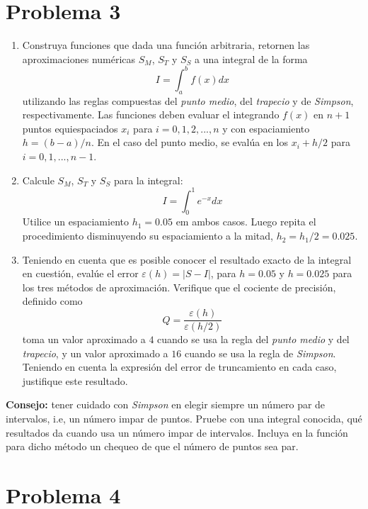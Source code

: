 \documentclass[11pt]{article}
\begin{document}
    \hypertarget{problema-3}{%
\section*{Problema 3}\label{problema-3}}

\begin{enumerate}
\def\labelenumi{\arabic{enumi}.}
\item
  Construya funciones que dada una función arbitraria, retornen las
  aproximaciones numéricas \(S_M\), \(S_T\) y \(S_S\) a una integral de
  la forma \[
  I = \int_a ^b f(x) dx
  \] utilizando las reglas compuestas del \emph{punto medio}, del
  \emph{trapecio} y de \emph{Simpson}, respectivamente. Las funciones
  deben evaluar el integrando \(f(x)\) en \(n+1\) puntos equiespaciados
  \(x_i\) para \(i=0,1,2,...,n\) y con espaciamiento \(h=(b-a)/n\). En
  el caso del punto medio, se evalúa en los \(x_i+h/2\) para
  \(i=0,1,...,n-1\).
\item
  Calcule \(S_M\), \(S_T\) y \(S_S\) para la integral: \[
  I = \int _0 ^1 e^{-x} dx
  \] Utilice un espaciamiento \(h_1=0.05\) em ambos casos. Luego repita
  el procedimiento disminuyendo su espaciamiento a la mitad,
  \(h_2=h_1/2=0.025\).
\item
  Teniendo en cuenta que es posible conocer el resultado exacto de la
  integral en cuestión, evalúe el error \(\varepsilon(h)=|S-I|\), para
  \(h=0.05\) y \(h=0.025\) para los tres métodos de aproximación.
  Verifique que el cociente de precisión, definido como \[
  Q = \frac{\varepsilon(h)}{\varepsilon(h/2)}
  \] toma un valor aproximado a \(4\) cuando se usa la regla del
  \emph{punto medio} y del \emph{trapecio}, y un valor aproximado a
  \(16\) cuando se usa la regla de \emph{Simpson}. Teniendo en cuenta la
  expresión del error de truncamiento en cada caso, justifique este
  resultado.
\end{enumerate}

\textbf{Consejo:} tener cuidado con \emph{Simpson} en elegir siempre un
número par de intervalos, i.e, un número impar de puntos. Pruebe con una
integral conocida, qué resultados da cuando usa un número impar de
intervalos. Incluya en la función para dicho método un chequeo de que el
número de puntos sea par.

    \hypertarget{problema-4}{%
\section*{Problema 4}\label{problema-4}}
\end{document}
